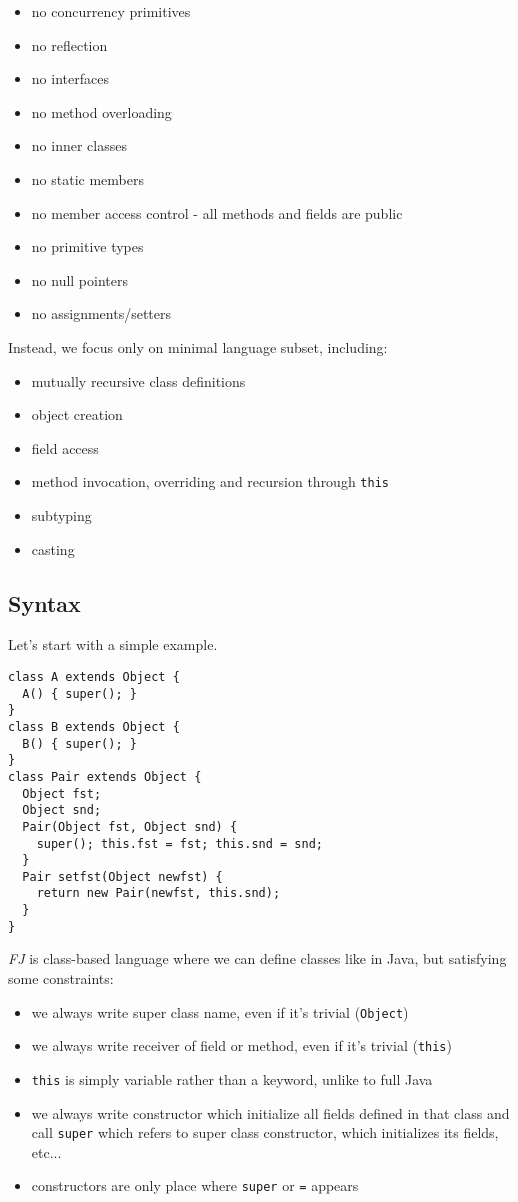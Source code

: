 \documentclass{article}[12pt]
\begin{document}
\begin{itemize}
\item no concurrency primitives
\item no reflection
\item no interfaces
\item no method overloading
\item no inner classes
\item no static members
\item no member access control - all methods and fields are public
\item no primitive types
\item no null pointers
\item no assignments/setters
\end{itemize}
Instead, we focus only on minimal language subset, including:

\begin{itemize}
\item mutually recursive class definitions
\item object creation
\item field access
\item method invocation, overriding and recursion through \texttt{this}
\item subtyping
\item casting
\end{itemize}


\subsection{Syntax}

Let's start with a simple example.

\begin{verbatim}
class A extends Object {
  A() { super(); }
}
class B extends Object {
  B() { super(); }
}
class Pair extends Object {
  Object fst;
  Object snd;
  Pair(Object fst, Object snd) {
    super(); this.fst = fst; this.snd = snd;
  }
  Pair setfst(Object newfst) {
    return new Pair(newfst, this.snd);
  }
}
\end{verbatim}
\emph{FJ} is class-based language where we can define classes like in Java, but satisfying some constraints:

\begin{itemize}
\item we always write super class name, even if it's trivial (\texttt{Object})
\item we always write receiver of field or method, even if it's trivial (\texttt{this})
\item \texttt{this} is simply variable rather than a keyword, unlike to full Java
\item we always write constructor which initialize all fields defined in that class and call \texttt{super} which refers to super class constructor, which initializes its fields, etc...
\item constructors are only place where \texttt{super} or \texttt{=} appears
\end{itemize}
\end{document}
